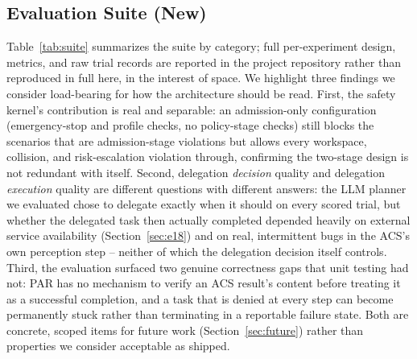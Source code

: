 \documentclass[conference]{IEEEtran}
\begin{document}
\subsection{Evaluation Suite (New)}
\label{sec:ablation}
Table~\ref{tab:suite} summarizes the suite by category; full per-experiment design, metrics, and raw trial records are
reported in the project repository rather than reproduced in full here, in the interest of space. We highlight
three findings we consider load-bearing for how the architecture should be read. First, the safety kernel's
contribution is real and separable: an admission-only configuration (emergency-stop and profile checks, no
policy-stage checks) still blocks the scenarios that are admission-stage violations but allows every
workspace, collision, and risk-escalation violation through, confirming the two-stage design is not
redundant with itself. Second, delegation \emph{decision} quality and delegation \emph{execution} quality are
different questions with different answers: the LLM planner we evaluated chose to delegate exactly when it
should on every scored trial, but whether the delegated task then actually completed depended heavily on
external service availability (Section~\ref{sec:e18}) and on real, intermittent bugs in the ACS's own perception step --
neither of which the delegation decision itself controls. Third, the evaluation surfaced two genuine
correctness gaps that unit testing had not: PAR has no mechanism to verify an ACS result's content before
treating it as a successful completion, and a task that is denied at every step can become permanently
stuck rather than terminating in a reportable failure state. Both are concrete, scoped items for future work
(Section~\ref{sec:future}) rather than properties we consider acceptable as shipped.
\end{document}
